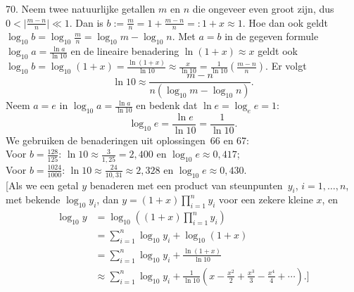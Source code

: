 \begin{problem}{70.}
	Neem twee natuurlijke getallen $m$ en $n$ die ongeveer even groot zijn, dus $0 < \lvert \frac{m - n}{n} \rvert \ll 1$. Dan is $b := \frac{m}{n} = 1 + \frac{m - n}{n} =: 1 + x \approx 1$. Hoe dan ook geldt $\log_{10} b = \log_{10} \frac{m}{n} = \log_{10} m - \log_{10} n$. Met $a = b$ in de gegeven formule $\log_{10} a = \frac{\ln a}{\ln 10}$ en de lineaire benadering $\ln (1 + x) \approx x$ geldt ook $\log_{10} b = \log_{10} (1 + x) = \frac{\ln (1 + x)}{\ln 10} \approx \frac{x}{\ln 10} = \frac{1}{\ln 10} \left( \frac{m - n}{n} \right)$. Er volgt
    \begin{equation*}
    	\ln 10 \approx \frac{m - n}{n (\log_{10} m - \log_{10} n)}.
    \end{equation*}
    Neem $a = e$ in $\log_{10} a = \frac{\ln a}{\ln 10}$ en bedenk dat $\ln e = \log_e e = 1$:
    \begin{equation*}
	    \log_{10} e = \frac{\ln e}{\ln 10} = \frac{1}{\ln 10}.
    \end{equation*}
    We gebruiken de benaderingen uit oplossingen~66 en 67:\\
Voor $b = \frac{128}{125}$: $\ln 10 \approx \frac{3}{1{,}25} = 2{,}400$ en $\log_{10} e \approx 0{,}417$;\\
Voor $b = \frac{1024}{1000}$: $\ln 10 \approx \frac{24}{10{,}31} \approx 2{,}328$ en $\log_{10} e \approx 0{,}430$.\\

    [Als we een getal $y$ benaderen met een product van steunpunten~$y_i$, $i = 1,\dotsc,n$, met bekende $\log_{10} y_i$, dan $y = (1 + x) \prod\limits_{i=1}^{n} y_{i}$ voor een zekere kleine $x$, en
    \begin{equation*}
    \begin{split}
		\log_{10} y & = \log_{10} \left( (1 + x) \textstyle\prod\limits_{i=1}^{n} y_{i} \right) \\
		            & = \textstyle\sum\limits_{i=1}^{n} \log_{10} y_{i} + \log_{10} (1 + x) \\
		            & = \textstyle\sum\limits_{i=1}^{n} \log_{10} y_{i} + \frac{\ln (1 + x)}{\ln 10} \\
		            & \approx \textstyle\sum\limits_{i=1}^{n} \log_{10} y_{i} + \frac{1}{\ln 10} \left( x - \frac{x^2}{2} + \frac{x^3}{3} - \frac{x^4}{4} + \dotsb \right).]
    \end{split}
	\end{equation*}
\end{problem}

